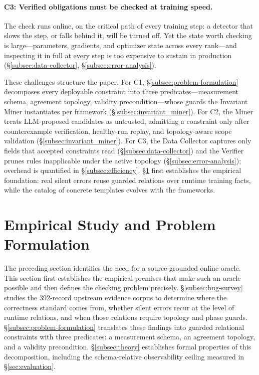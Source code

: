 \documentclass[sigconf,nonacm]{acmart}
\begin{document}
\paragraph{C3: Verified obligations must be checked at training speed.} The check runs online, on the critical path of every training step: a detector that slows the step, or falls behind it, will be turned off. Yet the state worth checking is large---parameters, gradients, and optimizer state across every rank---and inspecting it in full at every step is too expensive to sustain in production (\S\ref{subsec:data-collector}, \S\ref{subsec:error-analysis}).

These challenges structure the paper. For C1, \S\ref{subsec:problem-formulation} decomposes every deployable constraint into three predicates---measurement schema, agreement topology, validity precondition---whose guards the Invariant Miner instantiates per framework (\S\ref{subsec:invariant_miner}). For C2, the Miner treats LLM-proposed candidates as untrusted, admitting a constraint only after counterexample verification, healthy-run replay, and topology-aware scope validation (\S\ref{subsec:invariant_miner}). For C3, the Data Collector captures only fields that accepted constraints read (\S\ref{subsec:data-collector}) and the Verifier prunes rules inapplicable under the active topology (\S\ref{subsec:error-analysis}); overhead is quantified in \S\ref{subsec:efficiency}. \S\ref{sec:empirical} first establishes the empirical foundation: real silent errors reuse guarded relations over runtime training facts, while the catalog of concrete templates evolves with the frameworks.

\section{Empirical Study and Problem Formulation}
\label{sec:empirical}

The preceding section identifies the need for a source-grounded online oracle. This section first establishes the empirical premises that make such an oracle possible and then defines the checking problem precisely. \S\ref{subsec:bug-survey} studies the 392-record upstream evidence corpus to determine where the correctness standard comes from, whether silent errors recur at the level of runtime relations, and when those relations require topology and phase guards. \S\ref{subsec:problem-formulation} translates these findings into guarded relational constraints with three predicates: a measurement schema, an agreement topology, and a validity precondition. \S\ref{subsec:theory} establishes formal properties of this decomposition, including the schema-relative observability ceiling measured in \S\ref{sec:evaluation}.
\end{document}
